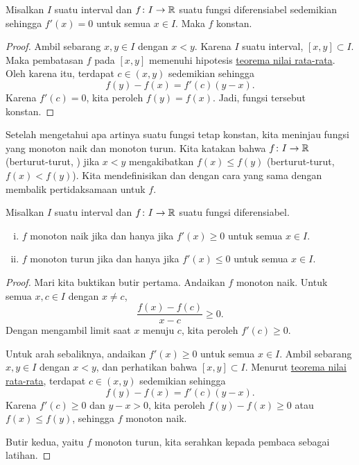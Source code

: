 \begin{prop} \label{prop:derzeroconst}
Misalkan $I$ suatu interval dan
$f \colon I \to {\mathbb{R}}$ suatu fungsi diferensiabel sedemikian sehingga $f'(x) = 0$
untuk semua $x \in I$.
Maka $f$ konstan.
\end{prop}

\begin{proof}
Ambil sebarang $x,y \in I$ dengan $x < y$.
Karena $I$ suatu interval, $[x,y] \subset I$.
Maka pembatasan $f$ pada $[x,y]$ memenuhi hipotesis
\hyperref[thm:mvt]{teorema nilai rata-rata}.
Oleh karena itu, terdapat $c \in (x,y)$ sedemikian sehingga
\begin{equation*}
f(y)-f(x) = f'(c)(y-x).
\end{equation*}
Karena $f'(c) = 0$, kita peroleh $f(y) = f(x)$.  Jadi,
fungsi tersebut konstan.
\end{proof}

Setelah mengetahui apa artinya suatu fungsi tetap konstan, kita meninjau
fungsi yang monoton naik dan monoton turun.
Kita katakan bahwa $f \colon I \to {\mathbb{R}}$ \emph{}
(berturut-turut, \emph{}) jika
$x < y$ mengakibatkan $f(x) \leq f(y)$ (berturut-turut, $f(x) < f(y)$).
Kita mendefinisikan
\emph{} dan
\emph{} dengan cara yang sama dengan membalik
pertidaksamaan untuk $f$.

\begin{prop} \label{incdecdiffprop}
Misalkan $I$ suatu interval dan
$f \colon I \to {\mathbb{R}}$ suatu fungsi diferensiabel.
\begin{enumerate}[(i)]
\item $f$ monoton naik jika dan hanya jika $f'(x) \geq 0$ untuk semua $x \in I$.
\item $f$ monoton turun jika dan hanya jika $f'(x) \leq 0$ untuk semua $x \in I$.
\end{enumerate}
\end{prop}

\begin{proof}
Mari kita buktikan butir pertama.  Andaikan $f$ monoton naik.
Untuk semua $x,c \in I$ dengan $x \neq c$,
\begin{equation*}
\frac{f(x)-f(c)}{x-c} \geq 0 .
\end{equation*}
Dengan mengambil limit saat $x$ menuju $c$, kita peroleh $f'(c) \geq 0$.

Untuk arah sebaliknya, andaikan $f'(x) \geq 0$ untuk semua $x \in I$.
Ambil sebarang $x, y \in I$ dengan $x < y$, dan perhatikan bahwa $[x,y] \subset I$.
Menurut \hyperref[thm:mvt]{teorema nilai rata-rata}, terdapat $c \in (x,y)$ sedemikian sehingga
\begin{equation*}
f(y)-f(x) = f'(c)(y-x) .
\end{equation*}
Karena $f'(c) \geq 0$ dan $y-x > 0$, kita peroleh $f(y) - f(x) \geq 0$ atau $f(x) \leq
f(y)$, sehingga
$f$ monoton naik.

Butir kedua, yaitu $f$ monoton turun, kita serahkan kepada pembaca sebagai latihan.
\end{proof}


